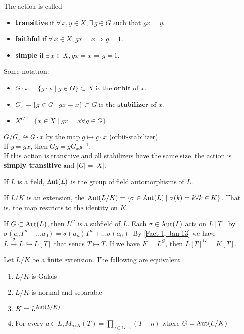 The action is called
\begin{itemize}
    \item \textbf{transitive} if $\forall \, x,y \in X, \exists \, g \in G$ such that $gx = y$.
    \item \textbf{faithful} if $\forall \, x \in X, gx = x \Rightarrow g = 1$.
    \item \textbf{simple} if $\exists \, x \in X, gx = x \Rightarrow g = 1$.
\end{itemize}
Some notation:
\begin{itemize}
    \item $G \cdot x = \{g \cdot x \mid g \in G \} \subset X$ is the \textbf{orbit} of $x$.
    \item $G_x = \{g \in G \mid gx = x \} \subset G$ is the \textbf{stabilizer} of $x$.
    \item $X^G = \{x \in X \mid gx = x \forall g \in G \}$
\end{itemize}
\noindent $G / G_x \cong G \cdot x$ by the map $g \mapsto g \cdot x$ (orbit-stabilizer) \\
If $y = gx$, then $Gg = gG_xg^{-1}$. \\
If this action is transitive and all stabilizers have the same size, the action is \textbf{simply transitive}
and $|G| = |X|$.
\setcounter{thm}{-1}
\begin{defn} \label{Def 0, Feb 15}
    If $L$ is a field, $\operatorname{Aut}(L)$ is the group of field automorphisms of $L$.
\end{defn}
\begin{rmk}
    If $L / K$ is an extension, the $\operatorname{Aut}(L/K) = \{\sigma \in \operatorname{Aut}(L) \mid \sigma(k) = k \forall k \in K\}$.
    That is, the map restricts to the identity on $K$.
\end{rmk}
If $G \subset \operatorname{Aut}(L)$, then $L^G$ is a subfield of $L$. Each $\sigma \in \operatorname{Aut}(L)$
acts on $L[T]$ by $\sigma(a_nT^n + \dots a_0) = \sigma(a_n)T^n + \dots \sigma(a_0)$.
By \ref{Fact 1, Jan 13} we have $L \overset{\sigma}{\rightarrow} L \hookrightarrow L[T]$ that sends
$T \mapsto T$. If we have $K = L^G$, then $L[T]^G = K[T]$.
\begin{prop} \label{Prop 1, Feb 15}
    Let $L / K$ be a finite extension. The following are equivalent.
    \begin{enumerate}
        \item $L / K$ is Galois
        \item $L / K$ is normal and separable
        \item $K = L^{\operatorname{Aut}(L/K)}$
        \item For every $a \in L, M_{a/K}(T) = \prod\limits_{\eta \in G \cdot a}{(T - \eta)}$ where $G = \operatorname{Aut}(L/K)$
    \end{enumerate}
\end{prop}
